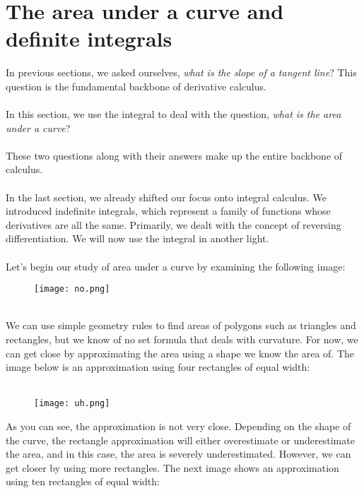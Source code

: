 \documentclass[11pt]{scrartcl}
\begin{document}
\maketitle
\noindent 

\section{The area under a curve and definite integrals}
\noindent
In previous sections, we asked ourselves, \textit{what is the slope of a tangent line}? This question is the fundamental backbone of derivative calculus. \\
\\
\noindent 
In this section, we use the integral to deal with the question, \textit{what is the area under a curve}? \\
\\
\noindent 
These two questions along with their answers make up the entire backbone of calculus. \\
\\
\noindent
In the last section, we already shifted our focus onto integral calculus. We introduced indefinite integrals, which represent a family of functions whose derivatives are all the same. Primarily, we dealt with the concept of reversing differentiation. We will now use the integral in another light. \\
\\
\noindent
Let's begin our study of area under a curve by examining the following image: 
\begin{figure}[htp]
    \centering
    \texttt{[image: no.png]}
\end{figure}\\
\noindent 
We can use simple geometry rules to find areas of polygons such as triangles and rectangles, but we know of no set formula that deals with curvature. For now, we can get close by approximating the area using a shape we know the area of. The image below is an approximation using four rectangles of equal width:\\
\\
\noindent 
\begin{figure}[htp]
    \centering
    \texttt{[image: uh.png]}
\end{figure}
\newpage
\noindent 
As you can see, the approximation is not very close. Depending on the shape of the curve, the rectangle approximation will either overestimate or underestimate the area, and in this case, the area is severely underestimated. However, we can get closer by using more rectangles. The next image shows an approximation using ten rectangles of equal width: 
\end{document}
